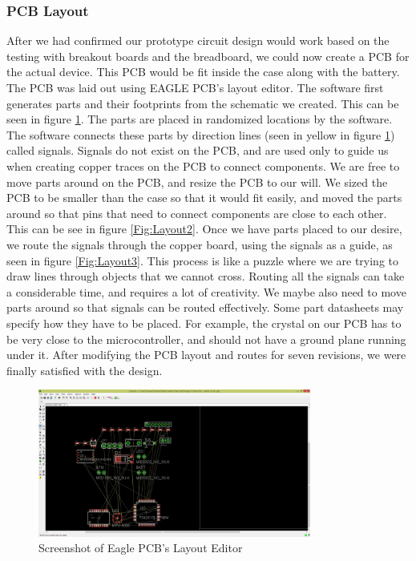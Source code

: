 \subsubsection{PCB Layout}
After we had confirmed our prototype circuit design would work based on the testing with breakout boards and the breadboard,
we could now create a PCB for the actual device.
This PCB would be fit inside the case along with the battery.
The PCB was laid out using EAGLE PCB's layout editor.
The software first generates parts and their footprints from the schematic we created.
This can be seen in figure \ref{Fig:Layout1}.
The parts are placed in randomized locations by the software.
The software connects these parts by direction lines (seen in yellow in figure \ref{Fig:Layout1}) called signals.
Signals do not exist on the PCB,
and are used only to guide us when creating copper traces on the PCB to connect components.
We are free to move parts around on the PCB, and resize the PCB to our will.
We sized the PCB to be smaller than the case so that it would fit easily, and moved the parts around so that pins that need to connect components are close to each other.
This can be see in figure \ref{Fig:Layout2}.
Once we have parts placed to our desire,
we route the signals through the copper board,
using the signals as a guide, as seen in figure \ref{Fig:Layout3}.
This process is like a puzzle where we are trying to draw lines through objects that we cannot cross.
Routing all the signals can take a considerable time,
and requires a lot of creativity.
We maybe also need to move parts around so that signals can be routed effectively.
Some part datasheets may specify how they have to be placed.
For example,
the crystal on our PCB has to be very close to the microcontroller,
and should not have a ground plane running under it.
After modifying the PCB layout and routes for seven revisions,
we were finally satisfied with the design.
\begin{figure}
\begin{center}
\includegraphics[width=0.8\textwidth]{images/Layout1.jpg}
\caption{Screenshot of Eagle PCB's Layout Editor}
\label{Fig:Layout1}
\end{center}
\end{figure}
